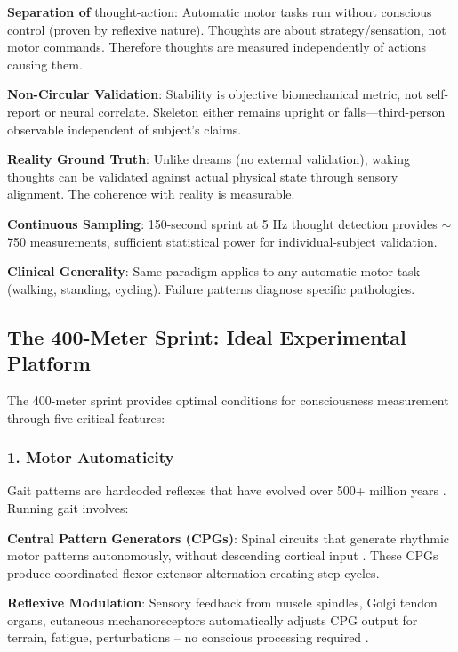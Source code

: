 \documentclass[11pt,onecolumn]{article}
\begin{document}
\textbf{Separation of} thought-action: Automatic motor tasks run without conscious control (proven by reflexive nature). Thoughts are about strategy/sensation, not motor commands. Therefore thoughts are measured independently of actions causing them.

\textbf{Non-Circular Validation}: Stability is objective biomechanical metric, not self-report or neural correlate. Skeleton either remains upright or falls---third-person observable independent of subject's claims.

\textbf{Reality Ground Truth}: Unlike dreams (no external validation), waking thoughts can be validated against actual physical state through sensory alignment. The coherence with reality is measurable.

\textbf{Continuous Sampling}: 150-second sprint at 5 Hz thought detection provides $\sim$750 measurements, sufficient statistical power for individual-subject validation.

\textbf{Clinical Generality}: Same paradigm applies to any automatic motor task (walking, standing, cycling). Failure patterns diagnose specific pathologies.

\subsection{The 400-Meter Sprint: Ideal Experimental Platform}

The 400-meter sprint provides optimal conditions for consciousness measurement through five critical features:

\subsubsection{1. Motor Automaticity}

Gait patterns are hardcoded reflexes that have evolved over 500+ million years \citep{grillner2011biological}. Running gait involves:

\textbf{Central Pattern Generators (CPGs)}: Spinal circuits that generate rhythmic motor patterns autonomously, without descending cortical input \citep{kiehn2016decoding}. These CPGs produce coordinated flexor-extensor alternation creating step cycles.

\textbf{Reflexive Modulation}: Sensory feedback from muscle spindles, Golgi tendon organs, cutaneous mechanoreceptors automatically adjusts CPG output for terrain, fatigue, perturbations -- no conscious processing required \citep{dietz2002human}.
\end{document}
